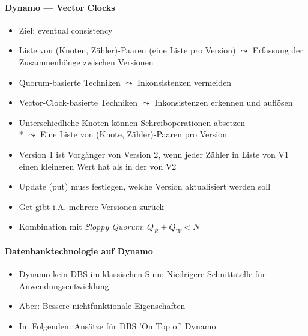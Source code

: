 \paragraph{Dynamo --- Vector Clocks}
\begin{itemize}
	\item Ziel: eventual consistency
	\item Liste von (Knoten, Zähler)-Paaren (eine Liste pro Version) \( \leadsto \) Erfassung der Zusammenhönge zwischen Versionen
	\item Quorum-basierte Techniken \( \leadsto \) Inkonsistenzen vermeiden
	\item Vector-Clock-basierte Techniken \( \leadsto \) Inkonsistenzen erkennen und auflösen
	\item Unterschiedliche Knoten können Schreiboperationen absetzen \\* \( \leadsto \) Eine Liste von (Knote, Zähler)-Paaren pro Version
	\item Version 1 ist Vorgänger von Version 2, wenn jeder Zähler in Liste von V1 einen kleineren Wert hat als in der von V2
	\item Update (put) muss festlegen, welche Version aktualisiert werden soll
	\item Get gibt i.A. mehrere Versionen zurück
	\item Kombination mit \emph{Sloppy Quorum}: \( Q_R+Q_W < N \)
\end{itemize}



\paragraph{Datenbanktechnologie auf Dynamo}
\begin{itemize}
	\item Dynamo kein DBS im klassischen Sinn: Niedrigere Schnittstelle für Anwendungsentwicklung
	\item Aber: Bessere nichtfunktionale Eigenschaften
	\item Im Folgenden: Ansätze für DBS 'On Top of' Dynamo
\end{itemize}

